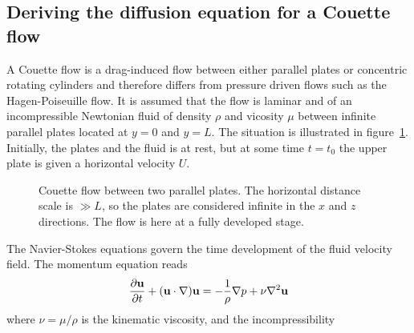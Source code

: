 \documentclass[aps,reprint]{revtex4-1}
\def\axislength{.5}
\begin{document}
\subsection{Deriving the diffusion equation for a Couette flow}
A Couette flow is a drag-induced flow between either parallel plates or concentric
rotating cylinders and therefore differs from pressure driven flows such as the
Hagen-Poiseuille flow. It is assumed that the flow is laminar and of an incompressible
Newtonian fluid of density $\rho$ and vicosity $\mu$ between infinite parallel
plates located at $y = 0$ and $y = L$. The situation is illustrated in figure~\ref{fig:couette}.
Initially, the plates and the fluid is at rest, but at some time $t = t_0$
the upper plate is given a horizontal velocity $U$.
\begin{figure}[H]
  \centering
  \caption{Couette flow between two parallel plates. The horizontal distance
  scale is $\gg L$, so the plates are considered infinite in the $x$ and $z$
  directions. The flow is here at a fully developed stage.}
  \label{fig:couette}
\end{figure}
The Navier-Stokes equations govern the time development of the fluid velocity field.
The momentum equation reads
\begin{align*}
  \pdv{\vb{u}}{t} + (\vb{u} \cdot \nabla) \vb{u} = - \frac{1}{\rho} \nabla p + \nu \nabla^2 \vb{u}
\end{align*}
where $\nu = \mu/\rho$ is the kinematic viscosity, and the incompressibility
\end{document}
